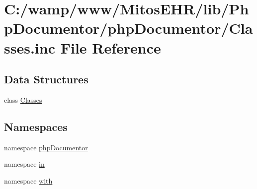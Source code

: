 \hypertarget{_classes_8inc}{\section{\-C\-:/wamp/www/\-Mitos\-E\-H\-R/lib/\-Php\-Documentor/php\-Documentor/\-Classes.inc \-File \-Reference}
\label{_classes_8inc}
}
\subsection*{\-Data \-Structures}
\begin{DoxyCompactItemize}
\item 
class \hyperlink{class_classes}{\-Classes}
\end{DoxyCompactItemize}
\subsection*{\-Namespaces}
\begin{DoxyCompactItemize}
\item 
namespace \hyperlink{namespacephp_documentor}{php\-Documentor}
\item 
namespace \hyperlink{namespacein}{in}
\item 
namespace \hyperlink{namespacewith}{with}
\end{DoxyCompactItemize}
